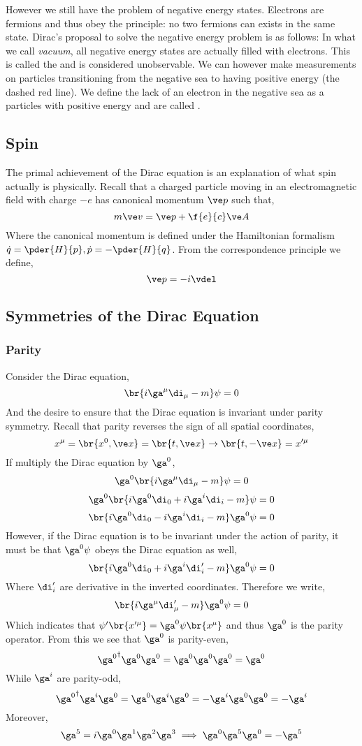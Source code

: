 \documentclass{article}
\begin{document}
However we still have the problem of negative energy states. Electrons are fermions and thus obey the  principle: no two fermions can exists in the same state. Dirac's proposal to solve the negative energy problem is as follows: In what we call \textit{vacuum}, all negative energy states are actually filled with electrons. This is called the  and is considered unobservable. We can however make measurements on particles transitioning from the negative sea to having positive energy (the dashed red line). We define the lack of an electron in the negative sea as a particles with positive energy and are called .

\subsection{Spin}

The primal achievement of the Dirac equation is an explanation of what spin actually is physically. Recall that a charged particle moving in an electromagnetic field with charge $- e$ has canonical momentum $\ve p$ such that,
\[ m \ve v = \ve p + \f{e}{c} \ve A \]
Where the canonical momentum is defined under the Hamiltonian formalism $\dot q = \pder{H}{p}, \dot p = - \pder{H}{q}$. From the correspondence principle we define,
\[ \ve p = - i \vdel \]


\subsection{Symmetries of the Dirac Equation}

\subsubsection{Parity}
Consider the Dirac equation,
\[ \br{i \ga^{\mu} \di_{\mu} - m} \psi = 0 \]
And the desire to ensure that the Dirac equation is invariant under parity symmetry. Recall that parity reverses the sign of all spatial coordinates,
\[ x^{\mu} = \br{x^0, \ve x} = \br{t , \ve x} \to \br{t, - \ve x} = x'^{\mu} \]
If multiply the Dirac equation by $\ga^{0}$,
\[ \ga^{0} \br{i \ga^{\mu} \di_{\mu} - m} \psi = 0 \]
\[ \ga^{0} \br{i \ga^{0} \di_{0} + i \ga^{i} \di_{i} - m} \psi = 0 \]
\[ \br{i \ga^{0} \di_{0} - i \ga^{i} \di_{i} - m} \ga^{0} \psi = 0 \]
However, if the Dirac equation is to be invariant under the action of parity, it must be that $\ga^{0} \psi$ obeys the Dirac equation as well,
\[ \br{i \ga^{0} \di_{0} + i \ga^{i} \di'_{i} - m} \ga^{0} \psi = 0 \]
Where $\di'_{i}$ are derivative in the inverted coordinates. Therefore we write,
\[ \br{i \ga^{\mu} \di'_{\mu} - m} \ga^{0} \psi = 0 \]
Which indicates that $\psi'\br{x'^{\mu}} = \ga^{0} \psi\br{x^{\mu}}$ and thus $\ga^{0}$ is the parity operator.
From this we see that $\ga^{0}$ is parity-even,
\[ {\ga^{0}}^{\dagger} \ga^{0} \ga^{0} = \ga^{0}\ga^{0}\ga^{0} = \ga^{0} \]
While $\ga^{i}$ are parity-odd,
\[ {\ga^{0}}^{\dagger} \ga^{i} \ga^{0} = \ga^{0}\ga^{i}\ga^{0} = -\ga^{i}\ga^{0}\ga^{0} = -\ga^{i} \]
Moreover,
\[ \ga^{5} = i \ga^{0} \ga^{1} \ga^{2} \ga^{3} \implies \ga^{0} \ga^{5} \ga^{0} = - \ga^{5} \]
\end{document}
